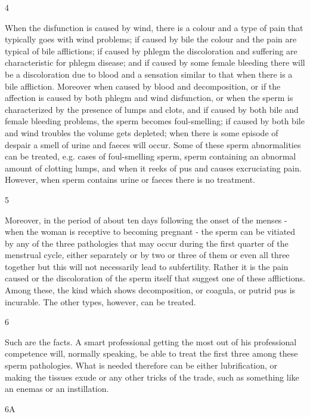 \begin{translation}
 \item[4]
 
  When the disfunction is caused by wind, there is a colour and a type of pain 
  that typically goes with wind problems; if  caused by bile the colour and the 
  pain are typical of bile afflictions; if caused by phlegm the discoloration and 
  suffering are characteristic for phlegm disease; and if caused by some female 
  bleeding there will be a discoloration due to blood and a sensation similar to 
  that when there is a bile affliction. Moreover when caused by blood and 
  decomposition, or if the affection is caused by both phlegm and wind 
  disfunction, or when the sperm is characterized by the presence of lumps and 
  clots, and if caused by both bile and female bleeding problems, the sperm 
  becomes foul-smelling; if caused by both bile and wind troubles the volume gets 
  depleted; when there is some episode of despair a smell of urine and faeces will 
  occur. Some of these sperm abnormalities can be treated, e.g. cases of 
  foul-smelling sperm, sperm containing an abnormal amount of clotting lumps, 
  and when it reeks of pus and causes excruciating pain. However, when sperm 
  contains urine or faeces there is no treatment.
 
 \item[5]
 
  Moreover, in the period of about ten days following the onset of the menses - 
  when the woman is receptive to becoming pregnant - the sperm can be vitiated 
  by any of the three pathologies that may occur during the first quarter of the 
  menstrual cycle, either separately or by two or three of them or even all three 
  together but this will not necessarily lead to subfertility. Rather it is  the pain 
  caused or the discoloration of the sperm itself that suggest one of these 
  afflictions. Among these, the kind which shows decomposition, or coagula, or 
  putrid pus is incurable. The other types, however, can be treated.  
 
 \item[6]
 
 Such are the facts. A smart professional getting the most out of his 
 professional competence will, normally speaking, be able to treat the first three 
 among these sperm pathologies. What is needed therefore can be either 
 lubrification, or making the tissues exude or any other tricks of the trade, such 
 as something like an enemas or an instillation.
 
 \item[6A]
 

\end{translation}
